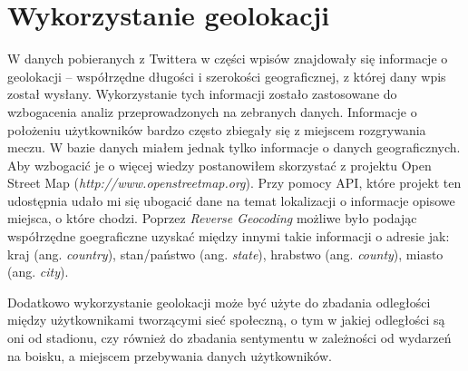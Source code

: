 \section{Wykorzystanie geolokacji}
\label{section:wykorzystaniegeolokacji}
W danych pobieranych z Twittera w części wpisów znajdowały się informacje o 
geolokacji -- współrzędne długości i szerokości geograficznej, z której
dany wpis został wysłany. Wykorzystanie tych informacji zostało zastosowane
do wzbogacenia analiz przeprowadzonych na zebranych danych. Informacje
o położeniu użytkowników bardzo często zbiegały się z miejscem rozgrywania meczu.
W bazie danych miałem jednak tylko informacje o danych geograficznych.
Aby wzbogacić je o więcej wiedzy postanowiłem skorzystać z projektu
Open Street Map (\textit{http://www.openstreetmap.org}).
Przy pomocy API, które projekt ten udostępnia udało mi się ubogacić dane
na temat lokalizacji o informacje opisowe miejsca, o które chodzi.
Poprzez \textit{Reverse Geocoding} możliwe było podając współrzędne
goegraficzne uzyskać między innymi takie informacji o adresie jak:
kraj (ang. \textit{country}), stan/państwo (ang. \textit{state}), 
hrabstwo (ang. \textit{county}), miasto (ang. \textit{city}).

Dodatkowo wykorzystanie geolokacji może być użyte do zbadania odległości między 
użytkownikami tworzącymi sieć społeczną, o tym w jakiej odległości są oni od stadionu,
czy również do zbadania sentymentu w zależności od wydarzeń na boisku,
a miejscem przebywania danych użytkowników. 












